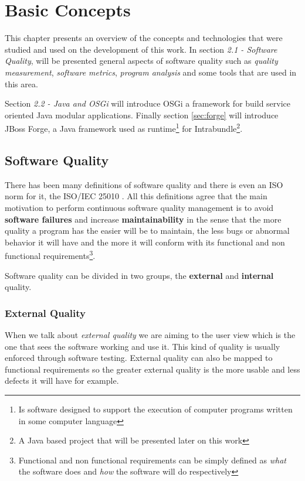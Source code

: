 \chapter{Basic Concepts}
This chapter presents an overview of the concepts and technologies that were studied and used on the development of this work. 
In section \textit{2.1 - Software Quality}, will be presented general aspects of software quality such as \textit{quality measurement},  \textit{software metrics}, \textit{program analysis} and some tools that are used in this area.  

Section \textit{2.2 - Java and OSGi} will introduce OSGi a framework for build service oriented Java modular applications. Finally section \ref{sec:forge} will introduce JBoss Forge, a Java framework used as runtime\footnote{Is software designed to support the execution of computer programs written in some computer language} for Intrabundle\footnote{A Java based project that will be presented later on this work}.   


\section{Software Quality}
\label{sec:quality}
There has been many definitions of software quality \citep[p. 23]{Kan 2002} and there is even an ISO norm for it, the ISO/IEC 25010 \citep{iso 2011}. All this definitions agree that the main motivation to perform continuous software quality management is to avoid \textbf{software failures} and increase \textbf{maintainability} in the sense that the more quality a program has the easier will be to maintain, the less bugs or abnormal behavior it will have and the more it will conform with its functional and non functional requirements\footnote{Functional and non functional requirements can be simply defined as \textit{what} the software does and \textit{how} the software will do respectively}. 

Software quality can be divided in two groups, the \textbf{external} and \textbf{internal} quality. 

\subsection{External Quality}
 When we talk about \textit{external quality} we are aiming to the user view which is the one that sees the software working and use it. This kind of quality is usually enforced through software testing. External quality can also be mapped to functional requirements so the greater external quality is the more usable and less defects it will have for example. 

